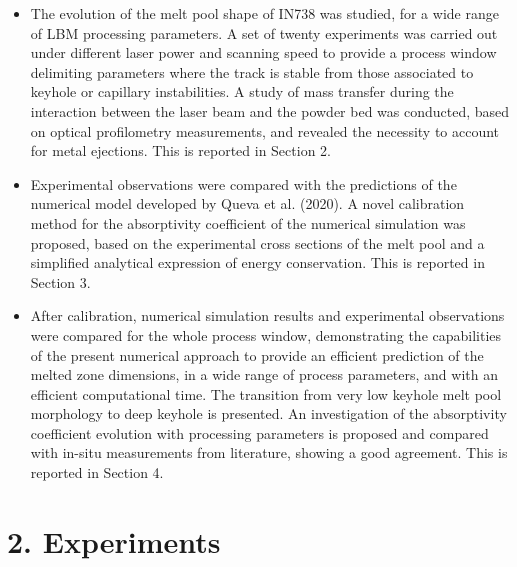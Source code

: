 \documentclass[10pt]{article}
\begin{document}
\begin{itemize}
  \item The evolution of the melt pool shape of IN738 was studied, for a wide range of LBM processing parameters. A set of twenty experiments was carried out under different laser power and scanning speed to provide a process window delimiting parameters where the track is stable from those associated to keyhole or capillary instabilities. A study of mass transfer during the interaction between the laser beam and the powder bed was conducted, based on optical profilometry measurements, and revealed the necessity to account for metal ejections. This is reported in Section 2.
  \item Experimental observations were compared with the predictions of the numerical model developed by Queva et al. (2020). A novel calibration method for the absorptivity coefficient of the numerical simulation was proposed, based on the experimental cross sections of the melt pool and a simplified analytical expression of energy conservation. This is reported in Section 3.
  \item After calibration, numerical simulation results and experimental observations were compared for the whole process window, demonstrating the capabilities of the present numerical approach to provide an efficient prediction of the melted zone dimensions, in a wide range of process parameters, and with an efficient computational time. The transition from very low keyhole melt pool morphology to deep keyhole is presented. An investigation of the absorptivity coefficient evolution with processing parameters is proposed and compared with in-situ measurements from literature, showing a good agreement. This is reported in Section 4.
\end{itemize}

\section*{2. Experiments}
\end{document}
